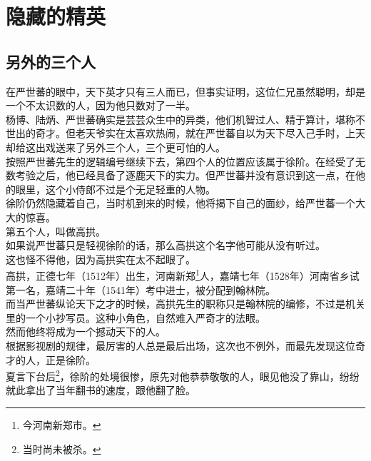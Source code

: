 \section{隐藏的精英}
\ifnum{}
	\begin{multicols}{\theparacolNo}
\fi
\subsection{另外的三个人}
在严世蕃的眼中，天下英才只有三人而已，但事实证明，这位仁兄虽然聪明，却是一个不太识数的人，因为他只数对了一半。\\

杨博、陆炳、严世蕃确实是芸芸众生中的异类，他们机智过人、精于算计，堪称不世出的奇才。但老天爷实在太喜欢热闹，就在严世蕃自以为天下尽入己手时，上天却给这出戏送来了另外三个人，三个更可怕的人。\\

按照严世蕃先生的逻辑编号继续下去，第四个人的位置应该属于徐阶。在经受了无数考验之后，他已经具备了逐鹿天下的实力。但严世蕃并没有意识到这一点，在他的眼里，这个小侍郎不过是个无足轻重的人物。\\

徐阶仍然隐藏着自己，当时机到来的时候，他将揭下自己的面纱，给严世蕃一个大大的惊喜。\\

第五个人，叫做高拱。\\

如果说严世蕃只是轻视徐阶的话，那么高拱这个名字他可能从没有听过。\\

这也怪不得他，因为高拱实在太不起眼了。\\

高拱，正德七年（1512年）出生，河南新郑\footnote{今河南新郑市。}人，嘉靖七年（1528年）河南省乡试第一名，嘉靖二十年（1541年）考中进士，被分配到翰林院。\\

而当严世蕃纵论天下之才的时候，高拱先生的职称只是翰林院的编修，不过是机关里的一个小抄写员。这种小角色，自然难入严奇才的法眼。\\

然而他终将成为一个撼动天下的人。\\

根据影视剧的规律，最厉害的人总是最后出场，这次也不例外，而最先发现这位奇才的人，正是徐阶。\\

夏言下台后\footnote{当时尚未被杀。}，徐阶的处境很惨，原先对他恭恭敬敬的人，眼见他没了靠山，纷纷就此拿出了当年翻书的速度，跟他翻了脸。\\


\end{multicols}
